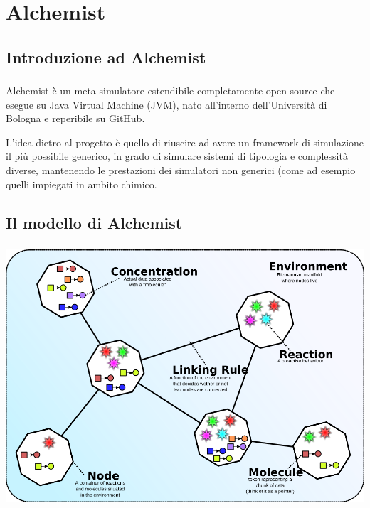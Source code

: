 \documentclass[%
]{beamer}
\begin{document}
    \section{Alchemist}\label{sec:alchemist}

    \subsection{Introduzione ad Alchemist}\label{subsec:alchIntro}
    \begin{frame}
        \frametitle{\insertsection}
        \framesubtitle{\insertsubsection}

        Alchemist è un meta-simulatore estendibile completamente open-source che esegue su Java Virtual Machine (JVM), nato all’interno dell’Università di Bologna e reperibile su GitHub.

        \medskip
        \pause

        L'idea dietro al progetto è quello di riuscire ad avere un framework di simulazione il più possibile generico, in grado di simulare sistemi di tipologia e complessità diverse, mantenendo le prestazioni dei simulatori non generici (come ad esempio quelli impiegati in ambito chimico.
    \end{frame}

    \subsection{Il modello di Alchemist}\label{subsec:alchModel}
    \begin{frame}
        \frametitle{\insertsection}
        \framesubtitle{\insertsubsection}

        \centering
        \includegraphics[scale=.34]{fig/alchemist_model}
    \end{frame}
\end{document}
